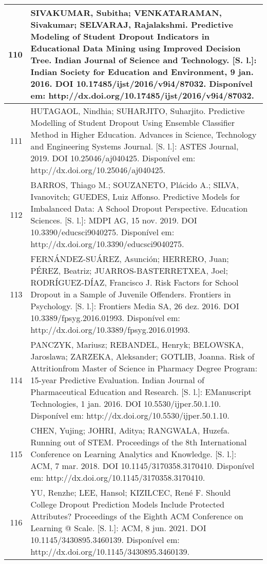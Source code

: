 \begin{apendicesenv}
\begin{longtable}[c]{|r|l|}
110 &
  \multicolumn{1}{p{14.5cm}|}{SIVAKUMAR, Subitha; VENKATARAMAN, Sivakumar; SELVARAJ, Rajalakshmi. Predictive Modeling of Student Dropout Indicators in Educational Data Mining using Improved Decision Tree. Indian Journal of Science and Technology. {[}S. l.{]}: Indian Society for Education and Environment, 9 jan. 2016. DOI 10.17485/ijst/2016/v9i4/87032. Disponível em: http://dx.doi.org/10.17485/ijst/2016/v9i4/87032.} \\ \hline
111 &
  \multicolumn{1}{p{14.5cm}|}{HUTAGAOL, Nindhia; SUHARJITO, Suharjito. Predictive Modelling of Student Dropout Using Ensemble Classifier Method in Higher Education. Advances in Science, Technology and Engineering Systems Journal. {[}S. l.{]}: ASTES Journal, 2019. DOI 10.25046/aj040425. Disponível em: http://dx.doi.org/10.25046/aj040425.} \\ \hline
112 &
  \multicolumn{1}{p{14.5cm}|}{BARROS, Thiago M.; SOUZANETO, Plácido A.; SILVA, Ivanovitch; GUEDES, Luiz Affonso. Predictive Models for Imbalanced Data: A School Dropout Perspective. Education Sciences. {[}S. l.{]}: MDPI AG, 15 nov. 2019. DOI 10.3390/educsci9040275. Disponível em: http://dx.doi.org/10.3390/educsci9040275.} \\ \hline
113 &
  \multicolumn{1}{p{14.5cm}|}{FERNÁNDEZ-SUÁREZ, Asunción; HERRERO, Juan; PÉREZ, Beatriz; JUARROS-BASTERRETXEA, Joel; RODRÍGUEZ-DÍAZ, Francisco J. Risk Factors for School Dropout in a Sample of Juvenile Offenders. Frontiers in Psychology. {[}S. l.{]}: Frontiers Media SA, 26 dez. 2016. DOI 10.3389/fpsyg.2016.01993. Disponível em: http://dx.doi.org/10.3389/fpsyg.2016.01993.} \\ \hline
114 &
  \multicolumn{1}{p{14.5cm}|}{PANCZYK, Mariusz; REBANDEL, Henryk; BELOWSKA, Jaroslawa; ZARZEKA, Aleksander; GOTLIB, Joanna. Risk of Attritionfrom Master of Science in Pharmacy Degree Program: 15-year Predictive Evaluation. Indian Journal of Pharmaceutical Education and Research. {[}S. l.{]}: EManuscript Technologies, 1 jan. 2016. DOI 10.5530/ijper.50.1.10. Disponível em: http://dx.doi.org/10.5530/ijper.50.1.10.} \\ \hline
115 &
  \multicolumn{1}{p{14.5cm}|}{CHEN, Yujing; JOHRI, Aditya; RANGWALA, Huzefa. Running out of STEM. Proceedings of the 8th International Conference on Learning Analytics and Knowledge. {[}S. l.{]}: ACM, 7 mar. 2018. DOI 10.1145/3170358.3170410. Disponível em: http://dx.doi.org/10.1145/3170358.3170410.} \\ \hline
116 &
  \multicolumn{1}{p{14.5cm}|}{YU, Renzhe; LEE, Hansol; KIZILCEC, René F. Should College Dropout Prediction Models Include Protected Attributes? Proceedings of the Eighth ACM Conference on Learning @ Scale. {[}S. l.{]}: ACM, 8 jun. 2021. DOI 10.1145/3430895.3460139. Disponível em: http://dx.doi.org/10.1145/3430895.3460139.} \\ \hline

\end{longtable}
\end{apendicesenv}
